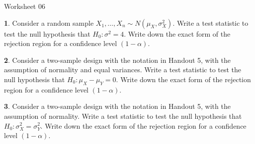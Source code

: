 \documentclass{tufte-handout}
\begin{document}
\justify

{\LARGE Worksheet 06}

\vspace*{18pt}


\textbf{1}. Consider a random sample $X_1, \ldots, X_n \sim N(\mu_X, \sigma^2_X)$. 
Write a test statistic to test the null hypothesis that $H_0: \sigma^2 = 4$.
Write down the exact form of the rejection region for a confidence level 
$(1 - \alpha)$.

\textbf{2}. Consider a two-sample design with the notation in Handout 5, with the assumption
of normality and equal variances. Write a test statistic to test the null
hypothesis that $H_0: \mu_X - \mu_Y = 0$. Write down the exact form of the
rejection region for a confidence level  $(1 - \alpha)$.

\textbf{3}. Consider a two-sample design with the notation in Handout 5, with the assumption
of normality. Write a test statistic to test the null
hypothesis that $H_0: \sigma_X^2 = \sigma_Y^2$. Write down the exact form of the
rejection region for a confidence level  $(1 - \alpha)$.
\end{document}
